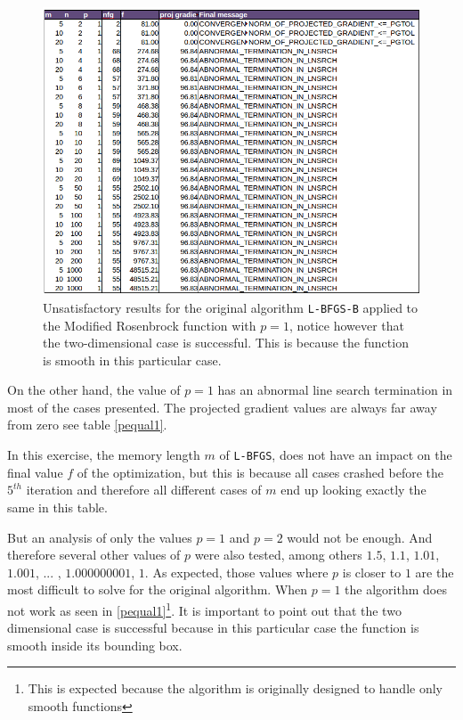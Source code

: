 \begin{figure}
\begin{center}
\includegraphics[scale=0.5]{Figures/abnormalNocedal.png}
\caption[Modified Rosenbrock with $p = 1$]{Unsatisfactory results for the original algorithm \texttt{L-BFGS-B} applied to the Modified Rosenbrock function with $p = 1$, notice however that the two-dimensional case is successful.  This is because the function is smooth in this particular case.}
\label{pequal1}
\end{center}
\end{figure}

On the other hand, the value of $p = 1$ has an abnormal line search termination in most of the cases presented. The projected gradient values are always far away from zero see table \eqref{pequal1}. 

In this exercise, the memory length $m$ of \texttt{L-BFGS}, does not have an impact on the final value $f$ of the optimization, but this is because all cases crashed before the $5^{th}$ iteration and therefore all different cases of $m$ end up looking exactly the same in this table.

But an analysis of only the values $p = 1$ and $p = 2$ would not be enough. And therefore several other values of $p$ were also tested, among others $1.5$, $1.1$, $1.01$, $1.001$, ... , $1.000000001$, $1$. As expected, those values where $p$ is closer to $1$ are the most difficult to solve for the original algorithm. When $p=1$ the algorithm does not work as seen in \eqref{pequal1}\footnote{This is expected because the algorithm is originally designed to handle only smooth functions}. It is important to point out that the two dimensional case is successful because in this particular case the function is smooth inside its bounding box.

